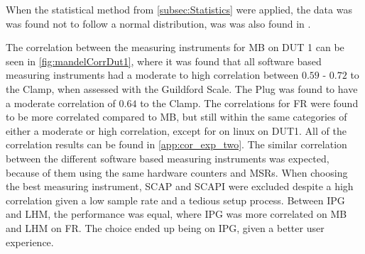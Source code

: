 When the statistical method from \cref{subsec:Statistics} were applied, the data was was found not to follow a normal distribution, was was also found in \cite{biksbois, Koedijk2022diff}.%


The correlation between the measuring instruments for MB on DUT 1 can be seen in \cref{fig:mandelCorrDut1}, where it was found that all software based measuring instruments had a moderate to high correlation between $0.59$ - $0.72$ to the Clamp, when assessed with the Guildford Scale. The Plug was found to have a moderate correlation of $0.64$ to the Clamp. The correlations for FR were found to be more correlated compared to MB, but still within the same categories of either a moderate or high correlation, except for on linux on DUT1. All of the correlation results can be found in \cref{app:cor_exp_two}. The similar correlation between the different software based measuring instruments was expected, because of them using the same hardware counters and MSRs. When choosing the best measuring instrument, SCAP and SCAPI were excluded despite a high correlation given a low sample rate and a tedious setup process. Between IPG and LHM, the performance was equal, where IPG was more correlated on MB and LHM on FR. The choice ended up being on IPG, given a better user experience. 


